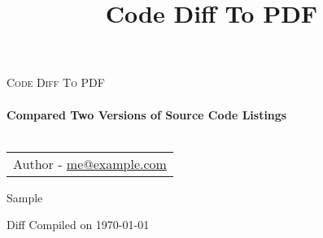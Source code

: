 \documentclass[10pt, oneside]{article}
\title{Code Diff To PDF}
\begin{document}
\sloppy

\begin{titlepage}

\center 
\textsc{\LARGE Code Diff To PDF}\\[1.5cm] 

\HRule \\[0.4cm]
{ \huge \bfseries Compared Two Versions of Source Code Listings 
}\\[0.4cm] 
\HRule \\[1.5cm]


\begin{center}
\begin{tabular}{ c} 
Author - \href{mailto:me@example.com}{me@example.com}
\end{tabular}
\end{center}

\vfill
Sample

Diff Compiled on \today
\vfill 

\end{titlepage}


\tableofcontents


\newpage





\newpage




\appendix

\newpage



% 

\end{document}
